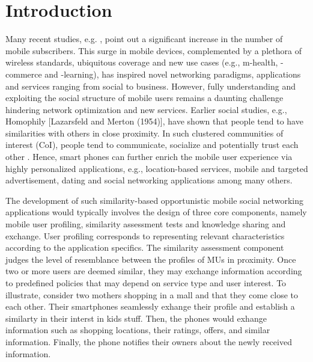 \documentclass{elsarticle}
\begin{document}
\section{Introduction }

Many recent studies, e.g. \citet{wbr}, point out a significant increase
in the number of mobile subscribers. This surge in mobile devices,
complemented by a plethora of wireless standards, ubiquitous coverage
and new use cases (e.g., m-health, -commerce and -learning), has inspired
novel networking paradigms, applications and services ranging from
social \citet{Isoc,ga} to business. However, fully understanding
and exploiting the social structure of mobile users remains a daunting
challenge hindering network optimization and new services. Earlier
social studies, e.g., Homophily {[}Lazarsfeld and Merton (1954){]},
have shown that people tend to have similarities with others in close
proximity. In such clustered communities of interest (CoI), people
tend to communicate, socialize and potentially trust each other \citet{csi}.
Hence, smart phones can further enrich the mobile user experience
via highly personalized applications, e.g., location-based services,
mobile and targeted advertisement, dating and social networking applications
among many others. 

The development of such similarity-based opportunistic mobile social
networking applications would typically involves the design of three
core components, namely mobile user profiling, similarity assessment
tests and knowledge sharing and exchange. User profiling corresponds
to representing relevant characteristics according to the application
specifics. The similarity assessment component judges the level of
resemblance between the profiles of MUs in proximity. Once two or
more users are deemed similar, they may exchange information according
to predefined policies that may depend on service type and user interest.
To illustrate, consider two mothers shopping in a mall and that they
come close to each other. Their smartphones seamlessly exhange their
profile and establish a similarty in their interst in kids stuff.
Then, the phones would exhange information such as shopping locations,
their ratings, offers, and similar information. Finally, the phone
notifies their owners about the newly received information. 
\end{document}
